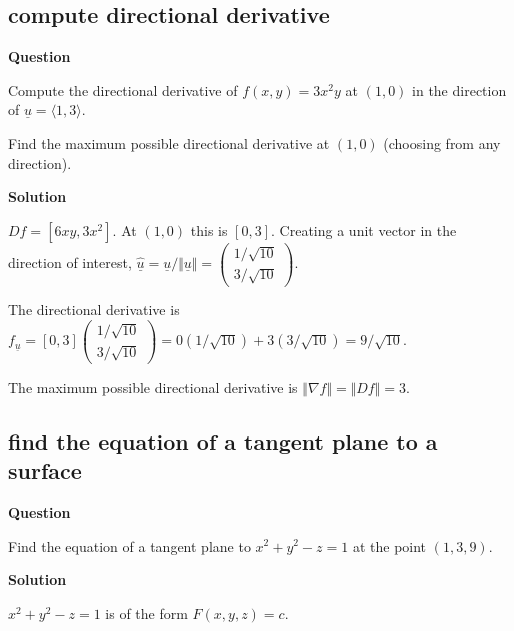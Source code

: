 \documentclass[12pt,letterpaper,noanswers]{exam}
\newcommand{\mb}[1]{\underline{#1}}
\begin{document}
\subsection{compute directional derivative}
\noindent\textbf{Question}


\begin{questions}
\item Compute the directional derivative of $f(x,y) = 3x^2y$ at $(1,0)$ in the direction of $\mb{u} = \langle 1,3\rangle$.
\item Find the maximum possible directional derivative at $(1,0)$ (choosing from any direction).
\end{questions}

\vspace{0.2cm}\noindent\textbf{Solution}

$Df = [6xy, 3x^2]$.  At $(1,0)$ this is $[0, 3]$.  Creating a unit vector in the direction of interest, $\hat{\mb{u}}=\mb{u}/\Vert\mb{u}\Vert = \left(\begin{array}{c} 1/\sqrt{10} \\ 3/\sqrt{10}\end{array}\right)$.

The directional derivative is $f_{\mb{u}} =[0, 3]\left(\begin{array}{c} 1/\sqrt{10} \\ 3/\sqrt{10}\end{array}\right) = 0(1/\sqrt{10}) + 3(3/\sqrt{10}) = 9/\sqrt{10}$.

The maximum possible directional derivative is $\Vert \nabla f \Vert = \Vert Df \Vert = 3.$

\subsection{find the equation of a tangent plane to a surface}

\noindent\textbf{Question}

Find the equation of a tangent plane to $x^2 +y^2 - z = 1$ at the point $(1,3,9)$.

\noindent\textbf{Solution}

$x^2 + y^2 - z = 1$ is of the form $F(x,y,z) = c$.
\end{document}
